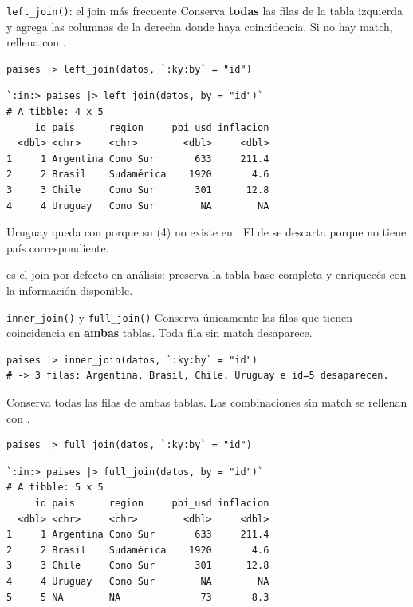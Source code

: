 \documentclass[8pt]{beamer}
\begin{document}
	\begin{frame}[fragile]{\texttt{left\_join()}: el join más frecuente}
		Conserva \textbf{todas} las filas de la tabla izquierda y agrega las columnas de la derecha donde haya coincidencia. Si no hay match, rellena con .

\begin{lstlisting}[style=RScript]
paises |> left_join(datos, `:ky:by` = "id")
\end{lstlisting}
\begin{lstlisting}[style=RConsole]
`:in:> paises |> left_join(datos, by = "id")`
# A tibble: 4 x 5
     id pais      region     pbi_usd inflacion
  <dbl> <chr>     <chr>        <dbl>     <dbl>
1     1 Argentina Cono Sur       633     211.4
2     2 Brasil    Sudamérica    1920       4.6
3     3 Chile     Cono Sur       301      12.8
4     4 Uruguay   Cono Sur        NA        NA
\end{lstlisting}

		Uruguay queda con  porque su  (4) no existe en . El  de  se descarta porque no tiene país correspondiente.

		\begin{block}{}
			 es el join por defecto en análisis: preserva la tabla base completa y enriquecés con la información disponible.
		\end{block}
	\end{frame}


	\begin{frame}[fragile]{\texttt{inner\_join()} y \texttt{full\_join()}}
		Conserva únicamente las filas que tienen coincidencia en \textbf{ambas} tablas. Toda fila sin match desaparece.
\begin{lstlisting}[style=RScript]
paises |> inner_join(datos, `:ky:by` = "id")
# -> 3 filas: Argentina, Brasil, Chile. Uruguay e id=5 desaparecen.
\end{lstlisting}

		Conserva todas las filas de ambas tablas. Las combinaciones sin match se rellenan con .
\begin{lstlisting}[style=RScript]
paises |> full_join(datos, `:ky:by` = "id")
\end{lstlisting}
\begin{lstlisting}[style=RConsole]
`:in:> paises |> full_join(datos, by = "id")`
# A tibble: 5 x 5
     id pais      region     pbi_usd inflacion
  <dbl> <chr>     <chr>        <dbl>     <dbl>
1     1 Argentina Cono Sur       633     211.4
2     2 Brasil    Sudamérica    1920       4.6
3     3 Chile     Cono Sur       301      12.8
4     4 Uruguay   Cono Sur        NA        NA
5     5 NA        NA              73       8.3
\end{lstlisting}
	\end{frame}
\end{document}
